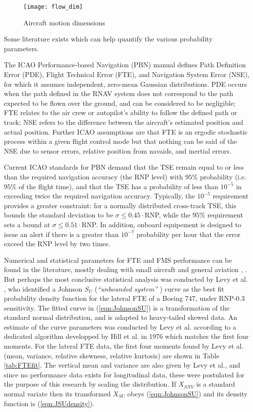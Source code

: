 \documentclass[conference]{IEEEtran}
\begin{document}
\begin{figure}[!h]
\centering
\texttt{[image: flow\_dim]}
\caption{Aircraft motion dimensions}
\label{fig:flow_dim}
\end{figure}

Some literature exists which can help quantify the various probability parameters.

The ICAO Performance-based Navigation (PBN) manual \cite{PBN08} defines Path Definition Error (PDE), Flight Technical Error (FTE), and Navigation System Error (NSE), for which it assumes independent, zero-mean Gaussian distributions. PDE occurs when the path defined in the RNAV system does not correspond to the path expected to be flown over the ground, and can be considered to be negligible; FTE relates to the air crew or autopilot's ability to follow the defined path or track; NSE refers to the difference between the aircraft's estimated position and actual position. Further ICAO assumptions are that FTE is an ergodic stochastic process within a given flight control mode but that nothing can be said of the NSE due to sensor errors, relative position from navaids, and inertial errors.

Current ICAO standards for PBN demand that the TSE remain equal to or less than the required navigation accuracy (the RNP level) with $95\%$ probability (i.e. $95\%$ of the flight time), and that the TSE has a probability of less than $10^{-5}$ in exceeding twice the required navigation accuracy. Typically, the $10^{-5}$ requirement provides a greater constraint: for a normally distributed cross-track TSE, this bounds the standard deviation to be $\sigma \le 0.45\cdot$RNP, while the $95\%$ requirement sets a bound at $\sigma \le 0.51\cdot$RNP. In addition, onboard equipement is designed to issue an alert if there is a greater than $10^{-7}$ probability per hour that the error exceed the RNP level by two times.

Numerical and statistical parameters for FTE and FMS performance can be found in the literature, mostly dealing with small aircraft and general aviation \cite{Hun93}, \cite{Wil05}. But perhaps the most conclusive statistical analysis was conducted by Levy et al. \cite{Lev03}, who identified a Johnson $S_U$ (\emph{``unbounded system''} \cite{Jon49}) curve as the best fit probability density function for the lateral FTE of a Boeing 747, under RNP-0.3 sensitivity. The fitted curve in (\ref{eqn:JohnsonSU}) is a transformation of the standard normal distribution, and is adapted to heavy-tailed skewed data. An estimate of the curve parameters was conducted by Levy et al. according to a dedicated algorithm developped by Hill et al. in 1976 \cite{Hil76} which matches the first four moments. For the lateral FTE data, the first four moments found by Levy et al. (mean, variance, relative skewness, relative kurtosis) are shown in Table \ref{tab:FTEfit}. The vertical mean and variance are also given by Levy et al., and since no performance data exists for longitudinal data, these were postulated for the purpose of this research by scaling the distribution. If $X_{SNV}$ is a standard normal variate then its transformed $X_{SU}$ obeys (\ref{eqn:JohnsonSU}) and its density function is (\ref{eqn:JSUdensity}).
\end{document}
